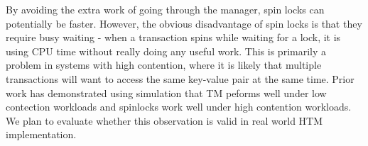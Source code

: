 By avoiding the extra work of going through the manager, spin locks can
potentially be faster. However, the obvious disadvantage of spin locks is that
they require busy waiting - when a transaction spins while waiting for a lock,
it is using CPU time without really doing any useful work. This is primarily a
problem in systems with high contention, where it is likely that multiple
transactions will want to access the same key-value pair at the same time. Prior
work \citep{tran2010} has demonstrated using simulation that TM peforms well
under low contection workloads and spinlocks work well under high contention
workloads. We plan to evaluate whether this observation is valid in real world
HTM implementation.


